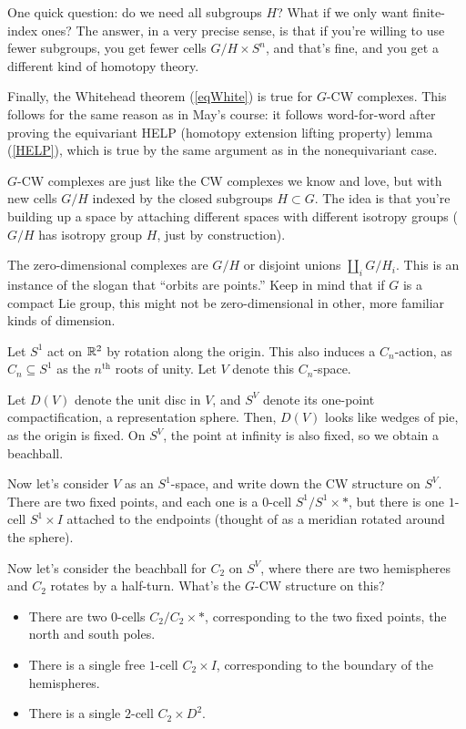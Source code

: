 One quick question: do we need all subgroups $H$? What if we only want finite-index ones? The answer, in a very
precise sense, is that if you're willing to use fewer subgroups, you get fewer cells $G/H\times S^n$, and that's
fine, and you get a different kind of homotopy theory.

Finally, the Whitehead theorem (\cref{eqWhite}) is true for $G$-CW complexes. This follows for the same reason as
in May's course: it follows word-for-word after proving the equivariant HELP (homotopy extension lifting property)
lemma (\cref{HELP}), which is true by the same argument as in the nonequivariant case.

$G$-CW complexes are just like the CW complexes we know and love, but with new cells $G/H$ indexed by the closed
subgroups $H\subset G$. The idea is that you're building up a space by attaching different spaces with different
isotropy groups ($G/H$ has isotropy group $H$, just by construction).
\begin{exm}
The zero-dimensional complexes are $G/H$ or disjoint unions $\amalg_i G/H_i$. This is an instance of the slogan
that ``orbits are points.'' Keep in mind that if $G$ is a compact Lie group, this might not be zero-dimensional in
other, more familiar kinds of dimension.
\end{exm}
\begin{exm}
\label{S2sigmaCW}
Let $S^1$ act on $\mathbb R^2$ by rotation along the origin. This also induces a $C_n$-action, as $C_n\subseteq S^1$ as
the $n^{\text{th}}$ roots of unity. Let $V$ denote this $C_n$-space.

Let $D(V)$ denote the unit disc in $V$, and $S^V$ denote its one-point compactification, a representation sphere.
Then, $D(V)$ looks like wedges of pie, as the origin is fixed. On $S^V$, the point at infinity is also fixed, so we
obtain a beachball. %

Now let's consider $V$ as an $S^1$-space, and write down the CW structure on $S^V$. There are two fixed points, and
each one is a $0$-cell $S^1/S^1\times *$, but there is one $1$-cell $S^1\times I$ attached to the endpoints
(thought of as a meridian rotated around the sphere).

Now let's consider the beachball for $C_2$ on $S^V$, where there are two hemispheres and $C_2$ rotates by a
half-turn. What's the $G$-CW structure on this?
\begin{itemize}
	\item There are two $0$-cells $C_2/C_2\times *$, corresponding to the two fixed points, the north and south
	poles.
	\item There is a single free $1$-cell $C_2\times I$, corresponding to the boundary of the hemispheres.
	\item There is a single $2$-cell $C_2\times D^2$.\qedhere
\end{itemize}
\end{exm}
